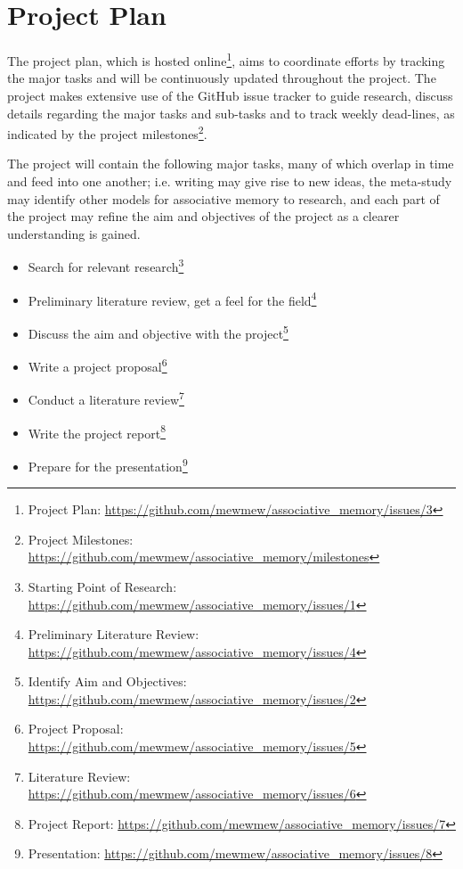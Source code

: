\documentclass[12pt, a4paper]{article}
\begin{document}
\section{Project Plan}

The project plan, which is hosted online\footnote{Project Plan: \url{https://github.com/mewmew/associative_memory/issues/3}}, aims to coordinate efforts by tracking the major tasks and will be continuously updated throughout the project. The project makes extensive use of the GitHub issue tracker to guide research, discuss details regarding the major tasks and sub-tasks and to track weekly dead-lines, as indicated by the project milestones\footnote{Project Milestones: \url{https://github.com/mewmew/associative_memory/milestones}}.

The project will contain the following major tasks, many of which overlap in time and feed into one another; i.e. writing may give rise to new ideas, the meta-study may identify other models for associative memory to research, and each part of the project may refine the aim and objectives of the project as a clearer understanding is gained.

\begin{itemize}
	\item Search for relevant research\footnote{Starting Point of Research: \url{https://github.com/mewmew/associative_memory/issues/1}}
	\item Preliminary literature review, get a feel for the field\footnote{Preliminary Literature Review: \url{https://github.com/mewmew/associative_memory/issues/4}}
	\item Discuss the aim and objective with the project\footnote{Identify Aim and Objectives: \url{https://github.com/mewmew/associative_memory/issues/2}}
	\item Write a project proposal\footnote{Project Proposal: \url{https://github.com/mewmew/associative_memory/issues/5}}
	\item Conduct a literature review\footnote{Literature Review: \url{https://github.com/mewmew/associative_memory/issues/6}}
	\item Write the project report\footnote{Project Report: \url{https://github.com/mewmew/associative_memory/issues/7}}
	\item Prepare for the presentation\footnote{Presentation: \url{https://github.com/mewmew/associative_memory/issues/8}}
\end{itemize}


\end{document}
